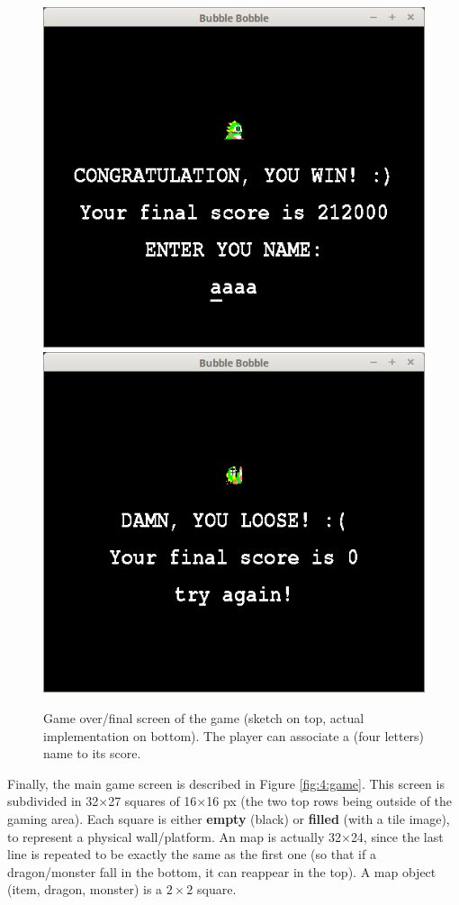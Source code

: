 \documentclass[12pt,a4paper]{article}
\begin{document}
\begin{figure}[!h]
	\centering
	 \\
	\vspace{.5cm}
			\includegraphics[width=.45\linewidth]{i/screen4}\hspace{.5cm}
			\includegraphics[width=.45\linewidth]{i/screen4b}
	\caption{Game over/final screen of the game (sketch on top, actual implementation on bottom). The player can associate a (four letters) name to its score.}
	\label{fig:3:gameover}
\end{figure}

Finally, the main game screen is described in Figure \ref{fig:4:game}. This screen is subdivided in 32$\times$27 squares of 16$\times$16 px (the two top rows being outside of the gaming area). Each square is either \textbf{empty} (black) or \textbf{filled} (with a tile image), to represent a physical wall/platform. An map is actually 32$\times$24, since the last line is repeated to be exactly the same as the first one (so that if a dragon/monster fall in the bottom, it can reappear in the top). A map object (item, dragon, monster) is a $2\times2$ square.
\end{document}

